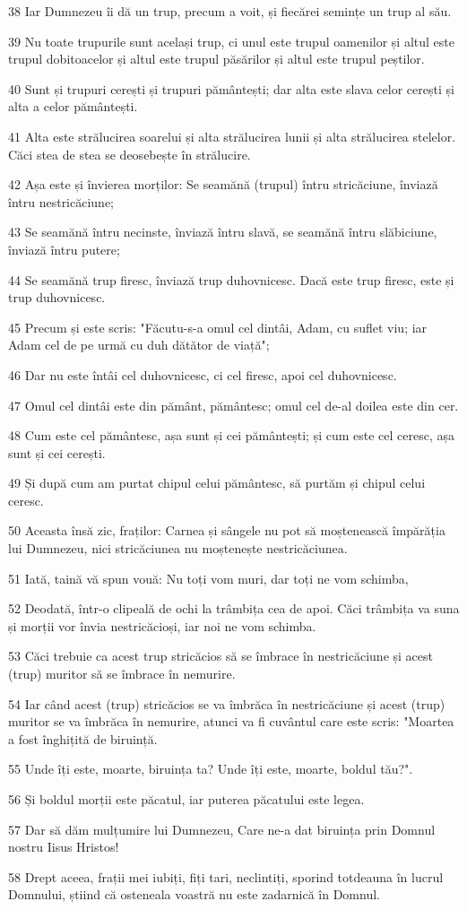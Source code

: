 \par 38 Iar Dumnezeu îi dă un trup, precum a voit, și fiecărei semințe un trup al său.
\par 39 Nu toate trupurile sunt același trup, ci unul este trupul oamenilor și altul este trupul dobitoacelor și altul este trupul păsărilor și altul este trupul peștilor.
\par 40 Sunt și trupuri cerești și trupuri pământești; dar alta este slava celor cerești și alta a celor pământești.
\par 41 Alta este strălucirea soarelui și alta strălucirea lunii și alta strălucirea stelelor. Căci stea de stea se deosebește în strălucire.
\par 42 Așa este și învierea morților: Se seamănă (trupul) întru stricăciune, înviază întru nestricăciune;
\par 43 Se seamănă întru necinste, înviază întru slavă, se seamănă întru slăbiciune, înviază întru putere;
\par 44 Se seamănă trup firesc, înviază trup duhovnicesc. Dacă este trup firesc, este și trup duhovnicesc.
\par 45 Precum și este scris: "Făcutu-s-a omul cel dintâi, Adam, cu suflet viu; iar Adam cel de pe urmă cu duh dătător de viață";
\par 46 Dar nu este întâi cel duhovnicesc, ci cel firesc, apoi cel duhovnicesc.
\par 47 Omul cel dintâi este din pământ, pământesc; omul cel de-al doilea este din cer.
\par 48 Cum este cel pământesc, așa sunt și cei pământești; și cum este cel ceresc, așa sunt și cei cerești.
\par 49 Și după cum am purtat chipul celui pământesc, să purtăm și chipul celui ceresc.
\par 50 Aceasta însă zic, fraților: Carnea și sângele nu pot să moștenească împărăția lui Dumnezeu, nici stricăciunea nu moștenește nestricăciunea.
\par 51 Iată, taină vă spun vouă: Nu toți vom muri, dar toți ne vom schimba,
\par 52 Deodată, într-o clipeală de ochi la trâmbița cea de apoi. Căci trâmbița va suna și morții vor învia nestricăcioși, iar noi ne vom schimba.
\par 53 Căci trebuie ca acest trup stricăcios să se îmbrace în nestricăciune și acest (trup) muritor să se îmbrace în nemurire.
\par 54 Iar când acest (trup) stricăcios se va îmbrăca în nestricăciune și acest (trup) muritor se va îmbrăca în nemurire, atunci va fi cuvântul care este scris: "Moartea a fost înghițită de biruință.
\par 55 Unde îți este, moarte, biruința ta? Unde îți este, moarte, boldul tău?".
\par 56 Și boldul morții este păcatul, iar puterea păcatului este legea.
\par 57 Dar să dăm mulțumire lui Dumnezeu, Care ne-a dat biruința prin Domnul nostru Iisus Hristos!
\par 58 Drept aceea, frații mei iubiți, fiți tari, neclintiți, sporind totdeauna în lucrul Domnului, știind că osteneala voastră nu este zadarnică în Domnul.

